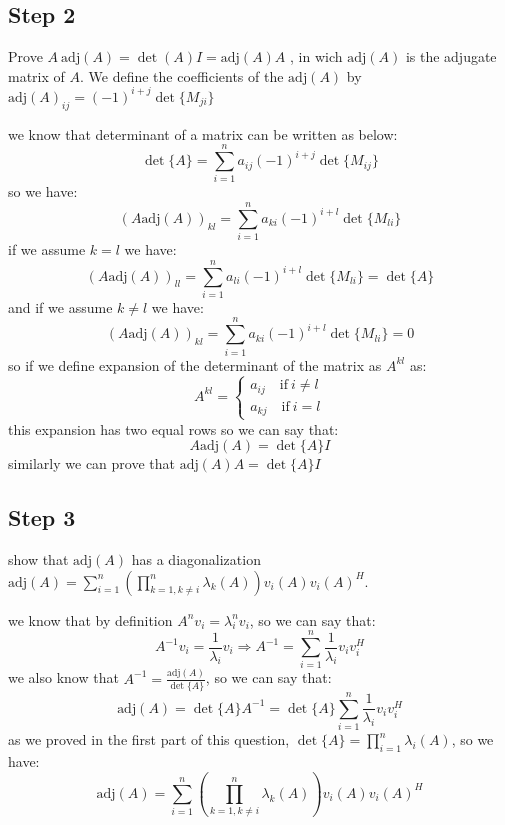 \subsection{Step 2}
Prove $A\ \text{adj}(A) = \det(A)I = \text{adj}(A)A$ , in wich $\text{adj}(A)$ is the adjugate matrix of $A$. We define the coefficients of the $\text{adj}(A)$ by $\text{adj}(A)_{ij} = (-1)^{i+j}\det\{M_{ji}\}$  
\begin{qsolve}
	\begin{qsolve}[]
		we know that determinant of a matrix can be written as below:
		$$\det\{A\} = \sum_{i=1}^{n} a_{ij}(-1)^{i+j}\det\{M_{ij}\}$$
		so we have:
		$$(A \text{adj}(A))_{kl} = \sum_{i=1}^{n} a_{ki}(-1)^{i+l}\det\{M_{li}\}$$
		if we assume $k=l$ we have:
		$$(A \text{adj}(A))_{ll} = \sum_{i=1}^{n} a_{li}(-1)^{i+l}\det\{M_{li}\} = \det\{A\}$$
		and if we assume $k\neq l$ we have:
		$$(A \text{adj}(A))_{kl} = \sum_{i=1}^{n} a_{ki}(-1)^{i+l}\det\{M_{li}\} = 0$$
		so if we define expansion of the determinant of the matrix as $A^{kl}$ as:
		$$A^{kl} = \left\{
			\begin{array}{ll}
				a_{ij} \quad \text{if}\ i\neq l \\
				a_{kj} \quad \text{if}\ i = l
			\end{array}
			\right.$$
		this expansion has two equal rows so we can say that:
		$$ A\text{adj}(A) = \det\{A\}I$$
		similarly we can prove that $\text{adj}(A)A = \det\{A\}I$	
	\end{qsolve}
\end{qsolve}
\subsection{Step 3}
show that $\text{adj}(A)$ has a diagonalization $\text{adj}(A) = \sum_{i=1}^{n} \left(\prod_{k=1,k\neq i}^{n}\lambda_k(A)\right) v_i(A)v_i(A)^H$.
\begin{qsolve}
	\begin{qsolve}[]
		we know that by definition $A^n v_i = \lambda_i^n v_i$, so we can say that:
		$$A^{-1} v_i = \frac{1}{\lambda_i} v_i \Rightarrow A^{-1} = \sum_{i=1}^{n} \frac{1}{\lambda_i} v_i v_i^H$$
		\splitqsolve[\splitqsolve]
		we also know that $A^{-1} = \frac{\text{adj}(A)}{\det\{A\}}$, so we can say that:
		$$\text{adj}(A) = \det\{A\} A^{-1} = \det\{A\} \sum_{i=1}^{n} \frac{1}{\lambda_i} v_i v_i^H$$
		as we proved in the first part of this question, $\det\{A\} = \prod_{i=1}^{n} \lambda_i(A)$, so we have:
		$$\text{adj}(A) = \sum_{i=1}^{n} \left(\prod_{k=1,k\neq i}^{n}\lambda_k(A)\right) v_i(A)v_i(A)^H$$
	\end{qsolve}
\end{qsolve}
